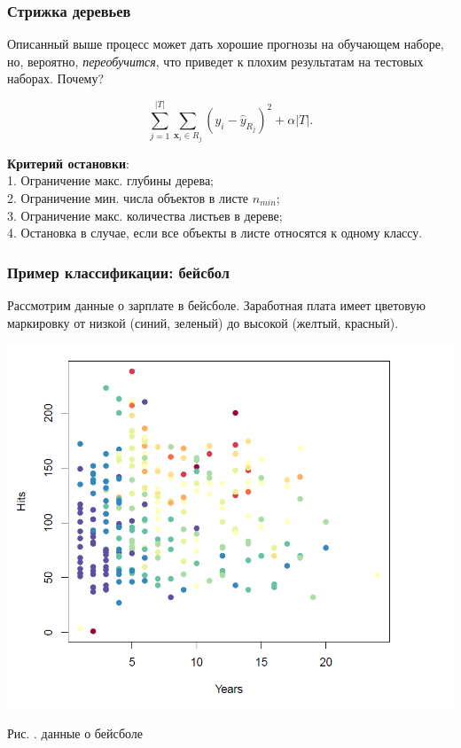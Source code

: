 \documentclass[pdf, 9pt, usenames, dvipsnames, unicode, hyperref={bookmarks=true,bookmarksopen=false, bookmarksnumbered}]{beamer}
\begin{document}

\begin{frame}\frametitle{Стрижка деревьев}

Описанный выше процесс может дать хорошие прогнозы на обучающем наборе, но, вероятно, \textit{переобучится}, что приведет к плохим результатам на тестовых наборах. Почему?

	$$\sum\limits_{j=1}^{|T|} \sum\limits_{\textbf{x}_i \in R_j}^{} (y_i - \hat{y}_{R_j})^2 + \alpha |T|.$$

\textbf{Критерий остановки}:\\
1. Ограничение макс. глубины дерева;\\
2. Ограничение мин. числа объектов в листе $n_{min}$;\\
3. Ограничение макс. количества листьев в дереве;\\
4. Остановка в случае, если все объекты в листе относятся к одному классу.

\end{frame}


\begin{frame}\frametitle{Пример классификации: бейсбол}

Рассмотрим данные о зарплате в бейсболе. Заработная плата имеет цветовую маркировку от низкой (синий, зеленый) до высокой (желтый, красный).

\begin{center}
    \includegraphics[scale=0.4]{pic61}
\end{center}

    \begin{center}
	Рис. . данные о бейсболе
    \end{center}


\end{frame}
\end{document}
